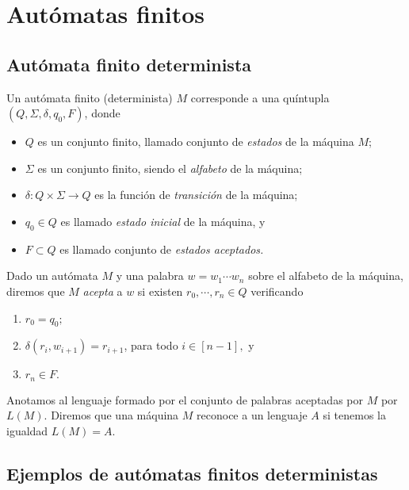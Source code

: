 
\section{Aut\'omatas finitos}

\subsection{Aut\'omata finito determinista}

\begin{definicion}\label{CT1-D-DFA}
    Un aut\'omata finito (determinista) \(M\) corresponde a una qu\'intupla \((Q,\Sigma,\delta,q_0,F)\), donde
    \begin{itemize}
        \item \(Q\) es un conjunto finito, llamado conjunto de \emph{estados} de la m\'aquina \(M\);
        \item \(\Sigma\) es un conjunto finito, siendo el \emph{alfabeto} de la m\'aquina;
        \item \(\delta: Q \times \Sigma \to Q \) es la funci\'on de \emph{transici\'on} de la m\'aquina;
        \item \(q_0\in Q\) es llamado \emph{estado inicial} de la m\'aquina, y
        \item \(F\subset Q\) es llamado conjunto de \emph{estados aceptados.}
    \end{itemize}
\end{definicion}

Dado un aut\'omata \(M\) y una palabra \(w=w_1\cdots w_n\) sobre el alfabeto de la m\'aquina, diremos que \(M\) \emph{acepta} a \(w\) si existen \(r_0,\cdots,r_n\in Q\) verificando
\begin{enumerate}
    \item \(r_0=q_0;\)
    \item \(\delta(r_i,w_{i+1})=r_{i+1}\), para todo \(i\in [n-1],\) y
    \item \(r_n\in F.\)
\end{enumerate}
Anotamos al lenguaje formado por el conjunto de palabras aceptadas por \( M \) por \(L(M).\)
Diremos que una m\'aquina \(M\) reconoce a un lenguaje \(A\) si tenemos la igualdad \(L(M)=A.\)

\subsection{Ejemplos de aut\'omatas finitos deterministas}

